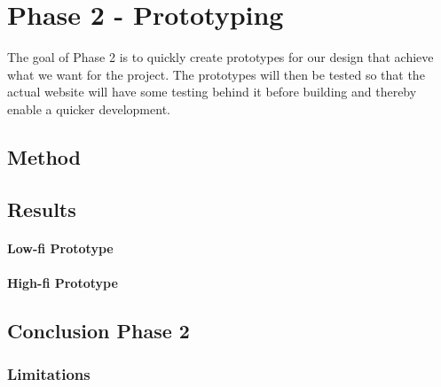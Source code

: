 
\chapter{Phase 2 - Prototyping} %

\label{Chapter5} %

The goal of Phase 2 is to quickly create prototypes for our design that achieve what we want for the project. The prototypes will then be tested so that the actual website will have some testing behind it before building and thereby enable a quicker development.

\section{Method}


\section{Results}
\subsubsection{Low-fi Prototype}

\subsubsection{High-fi Prototype}

\section{Conclusion Phase 2}



\subsection{Limitations}